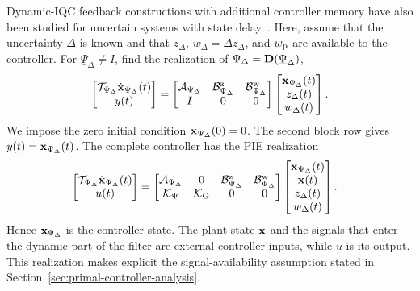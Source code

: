 Dynamic-IQC feedback constructions with additional controller memory have
also been studied for uncertain systems with state delay~\cite{7353149}.
Here, assume that the uncertainty $\Delta$ is known and
that $z_\Delta$, $w_\Delta=\Delta z_\Delta$, and $w_{{\mathrm{p}}}$ are available
to the controller. For $\underline{\Psi}_\Delta\neq I$, find the realization of $\Psi_\Delta = \mathbf{D}(\underline{\Psi}_\Delta)$,
\begin{equation*}
\begin{bmatrix}
\mathcal{T}_{{\Psi}_\Delta}
\dot{\mathbf{x}}_{{\Psi}_\Delta}(t)\\
y(t)
\end{bmatrix}
=
\begin{bmatrix}
\mathcal{A}_{{\Psi}_\Delta}
&\mathcal{B}_{{\Psi}_\Delta}^{{\mathrm{z}}}
&\mathcal{B}_{{\Psi}_\Delta}^{{\mathrm{w}}}\\
I&0&0
\end{bmatrix}
\begin{bmatrix}
\mathbf{x}_{{\Psi}_\Delta}(t)\\
z_\Delta(t)\\
w_\Delta(t)
\end{bmatrix}.
\end{equation*}
We impose the zero initial condition
$\mathbf{x}_{{\Psi}_\Delta}(0)=0$. The second block row gives
$y(t)=\mathbf{x}_{{\Psi}_\Delta}(t)$. The complete controller has the PIE
realization
\begin{equation*}
\begin{aligned}
\begin{bmatrix}
\mathcal{T}_{{\Psi}_\Delta}
\dot{\mathbf{x}}_{{\Psi}_\Delta}(t)\\
u(t)
\end{bmatrix}
&=
\begin{bmatrix}
\mathcal{A}_{{\Psi}_\Delta}
&0
&\mathcal{B}_{{\Psi}_\Delta}^{{\mathrm{z}}}
&\mathcal{B}_{{\Psi}_\Delta}^{{\mathrm{w}}}\\
\mathcal{K}_\Psi&\mathcal{K}_{{\mathrm{G}}} & 0 & 0
\end{bmatrix}
\begin{bmatrix}
\mathbf{x}_{{\Psi}_\Delta}(t)\\
\mathbf{x}(t)\\
z_\Delta(t)\\
w_\Delta(t)
\end{bmatrix}.
\end{aligned}
\end{equation*}
Hence $\mathbf{x}_{{\Psi}_\Delta}$ is the controller state. The plant state
$\mathbf{x}$ and the signals that enter the dynamic part of the filter are
external controller inputs, while $u$ is its output. This
realization makes explicit the signal-availability assumption stated in
Section~\ref{sec:primal-controller-analysis}.
